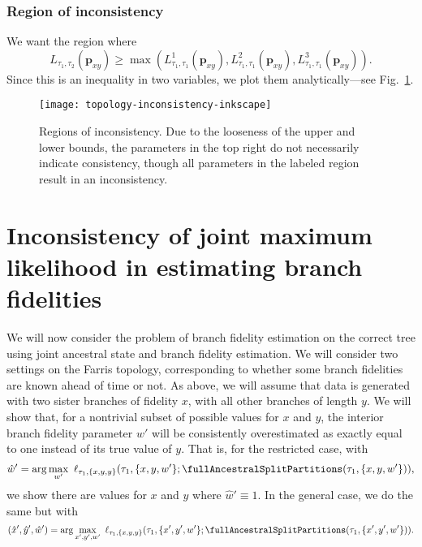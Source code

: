 \subsubsection{Region of inconsistency}

We want the region where
$$
L_{\tau_1,\tau_2}(\mathbf{p}_{xy}) \ge \max(L^{1}_{\tau_1,\tau_1}(\mathbf{p}_{xy}), L^{2}_{\tau_1,\tau_1}(\mathbf{p}_{xy}),L^{3}_{\tau_1,\tau_1}(\mathbf{p}_{xy})).
$$
Since this is an inequality in two variables, we plot them analytically---see Fig.~\ref{fig:inconsistency-farris}.

\begin{figure}
\centering
\texttt{[image: topology-inconsistency-inkscape]}
\caption{
    Regions of inconsistency.
    Due to the looseness of the upper and lower bounds, the parameters in the top right do not necessarily indicate consistency, though all parameters in the labeled region result in an inconsistency.
}
\label{fig:inconsistency-farris}
\end{figure}

\section{Inconsistency of joint maximum likelihood in estimating branch fidelities}

We will now consider the problem of branch fidelity estimation on the correct tree using joint ancestral state and branch fidelity estimation.
We will consider two settings on the Farris topology, corresponding to whether some branch fidelities are known ahead of time or not.
As above, we will assume that data is generated with two sister branches of fidelity $x$, with all other branches of length $y$.
We will show that, for a nontrivial subset of possible values for $x$ and $y$, the interior branch fidelity parameter $w'$ will be consistently overestimated as exactly equal to one instead of its true value of $y$.
That is, for the restricted case, with
$$
\hat{w}' = \arg\max_{w'} \ \ell_{\tau_1,\{x,y,y\}}(\tau_1, \{x,y,w'\}; \fullAncestralSplitPartitions(\tau_1,\{x,y,w'\})),
$$
we show there are values for $x$ and $y$ where $\hat{w}'\equiv 1$.
In the general case, we do the same but with
$$
(\hat{x}', \hat{y}', \hat{w}') = \arg\max_{x',y',w'} \ \ell_{\tau_1,\{x,y,y\}}(\tau_1, \{x',y',w'\}; \fullAncestralSplitPartitions(\tau_1,\{x',y',w'\})).
$$


